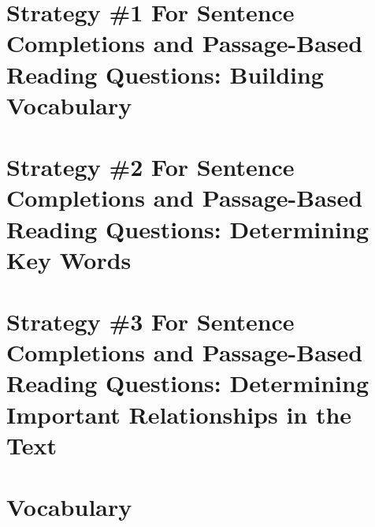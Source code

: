 \documentclass[12pt]{book}
\begin{document}
\chapter{Strategy \#1 For Sentence Completions and Passage-Based Reading Questions: Building Vocabulary}
	
	
	
	
	
	
	
	
	
	
	
	
	

\chapter{Strategy \#2 For Sentence Completions and Passage-Based Reading Questions: Determining Key Words}
	
	
	
	
	
	
	

\chapter{Strategy \#3 For Sentence Completions and Passage-Based Reading Questions: Determining Important Relationships in the Text}
	
	
	
	
	

\chapter{Vocabulary}
	


\end{document}
